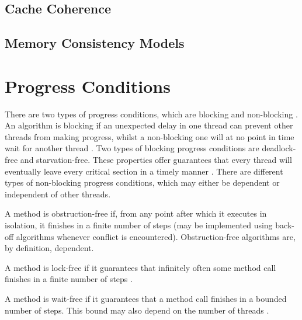 \subsection{Cache Coherence}

\subsection{Memory Consistency Models}

\section{Progress Conditions}
There are two types of progress conditions, which are blocking and non-blocking \cite[Chapter~3.7]{herlihy2020art}. An algorithm is blocking if an unexpected delay in one thread can prevent other threads from making progress, whilst a non-blocking one will at no point in time wait for another thread \cite[Chapter~3.7]{herlihy2020art}. Two types of blocking progress conditions are deadlock-free and starvation-free. These properties offer guarantees that every thread will eventually leave every critical section in a timely manner \cite[Chapter~3.7.1]{herlihy2020art}. There are different types of non-blocking progress conditions, which may either be dependent or independent of other threads. 

A method is obstruction-free if, from any point after which it executes in isolation, it finishes in a finite number of steps (may be implemented using back-off algorithms whenever conflict is encountered)\cite{herlihy2020art,herlihy2003obstruction}. Obstruction-free algorithms are, by definition, dependent.

A method is lock-free if it guarantees that infinitely often some method call finishes in a finite number of steps \cite{herlihy2020art}.

A method is wait-free if it guarantees that a method call finishes in a bounded number of steps. This bound may also depend on the number of threads \cite{herlihy2020art}.

